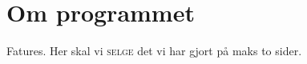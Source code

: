 \chapter*{Om programmet}
Fatures. Her skal vi \textsc{\LARGE selge} det vi har gjort på maks to sider.